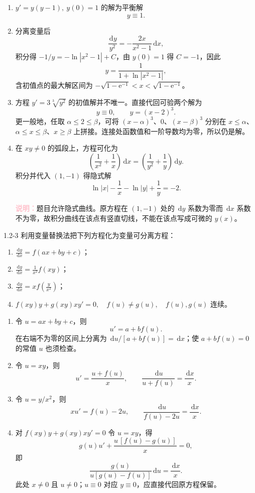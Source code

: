 \documentclass[UTF8,a4paper,11pt]{ctexart}
\newcommand{\dd}{\,\mathrm d}
\newcommand{\e}{\mathrm e}
\newcommand{\note}[1]{\par\smallskip\noindent\textcolor{pink}{\bfseries 说明：}#1\par\smallskip}
\begin{document}
\begin{solution}
\begin{enumerate}[label=(\arabic*)]
\item $y'=y(y-1),\ y(0)=1$ 的解为平衡解
\[
\boxed{y\equiv1}.
\]
\item 分离变量后
\[
\frac{\dd y}{y^2}=-\frac{2x}{x^2-1}\dd x,
\]
积分得 $-1/y=-\ln|x^2-1|+C$，由 $y(0)=1$ 得 $C=-1$，因此
\[
\boxed{y=\frac{1}{1+\ln|x^2-1|}},
\]
含初值点的最大解区间为
$-\sqrt{1-\e^{-1}}<x<\sqrt{1-\e^{-1}}$。
\item 方程 $y'=3\sqrt[3]{y^2}$ 的初值解并不唯一。直接代回可验两个解为
\[
\boxed{y\equiv0},\qquad \boxed{y=(x-2)^3}.
\]
更一般地，任取 $\alpha\le2\le\beta$，可将 $(x-\alpha)^3$、$0$、$(x-\beta)^3$ 分别在 $x\le\alpha$、$\alpha\le x\le\beta$、$x\ge\beta$ 上拼接。连接处函数值和一阶导数均为零，所以仍是解。
\item 在 $xy\ne0$ 的弧段上，方程可化为
\[
\left(\frac1{x^2}+\frac1x\right)\dd x
=\left(\frac1{y^2}+\frac1y\right)\dd y.
\]
积分并代入 $(1,-1)$ 得隐式解
\[
\boxed{\ln|x|-\frac1x-\ln|y|+\frac1y=-2}.
\]
\note{题目允许隐式曲线。原方程在 $(1,-1)$ 处的 $\dd y$ 系数为零而 $\dd x$ 系数不为零，故积分曲线在该点有竖直切线，不能在该点写成可微的 $y(x)$。}
\end{enumerate}
\end{solution}

\begin{problem}{1.2-3}
利用变量替换法把下列方程化为变量可分离方程：
  \begin{enumerate}[label=(\arabic*)]
    \item $\displaystyle \frac{\dd y}{\dd x}=f(ax+by+c)$；
    \item $\displaystyle \frac{\dd y}{\dd x}=\frac1{x^2}f(xy)$；
    \item $\displaystyle \frac{\dd y}{\dd x}=x f\!\left(\frac{y}{x^2}\right)$；
    \item $\displaystyle f(xy)y+g(xy)xy'=0,\quad f(u)\ne g(u),\quad f(u),g(u)\text{ 连续}$。
  \end{enumerate}
\end{problem}

\begin{solution}
\begin{enumerate}[label=(\arabic*)]
\item 令 $u=ax+by+c$，则
\[
\boxed{u'=a+bf(u)}.
\]
在右端不为零的区间上分离为 $\dd u/[a+bf(u)]=\dd x$；使 $a+bf(u)=0$ 的常值 $u$ 也须检查。
\item 令 $u=xy$，则
\[
\boxed{u'=\frac{u+f(u)}{x}},\qquad \frac{\dd u}{u+f(u)}=\frac{\dd x}{x}.
\]
\item 令 $u=y/x^2$，则
\[
\boxed{x u'=f(u)-2u},\qquad \frac{\dd u}{f(u)-2u}=\frac{\dd x}{x}.
\]
\item 对 $f(xy)y+g(xy)xy'=0$ 令 $u=xy$，得
\[
g(u)u'+\frac{u\,[f(u)-g(u)]}{x}=0,
\]
即
\[
\boxed{\frac{g(u)}{u[g(u)-f(u)]}\dd u=\frac{\dd x}{x}}.
\]
此处 $x\ne0$ 且 $u\ne0$；$u\equiv0$ 对应 $y\equiv0$，应直接代回原方程保留。
\end{enumerate}
\end{solution}
\end{document}
